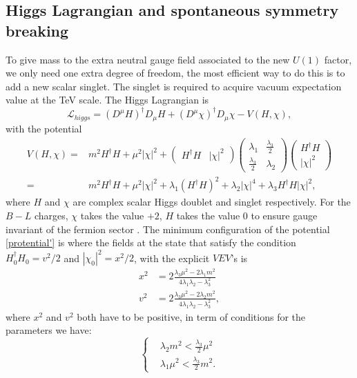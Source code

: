 \documentclass{report}
\newcommand{\nn}{\nonumber}
\numberwithin{equation}{section}
\begin{document}
\subsection{Higgs Lagrangian and spontaneous symmetry breaking}
To give mass to the extra neutral gauge field associated to the new $U(1)$ factor, we only need one extra degree of freedom, the most efficient way to do this is to add a new scalar singlet. The singlet is required to acquire vacuum expectation value at the TeV scale.
The Higgs Lagrangian is
\begin{equation}
\mathcal{L}_{higgs}=(D^\mu H)^\dagger D_\mu H+(D^\mu\chi)^\dagger  D_\mu \chi- V(H,\chi) \label{kinetic B-L},
\end{equation}
with the potential
\begin{align}
V(H,\chi)=& m^2H^\dagger H+\mu^2|\chi|^2+\begin{pmatrix}
H^\dagger H & |\chi|^2
\end{pmatrix}
\begin{pmatrix}
\lambda_1 & \frac{\lambda_3}{2}\\
\frac{\lambda_3}{2}& \lambda_2
\end{pmatrix}
\begin{pmatrix}
H^\dagger H\\
|\chi|^2
\end{pmatrix}\nn\\
=&m^2 H^\dagger H+\mu^2|\chi|^2+ \lambda_1(H^\dagger H)^2+\lambda_2 |\chi|^4+\lambda_3 H^\dagger H|\chi|^2\label{protential'},
\end{align}
where $H$ and $\chi$ are complex scalar Higgs doublet and singlet respectively. For the $B-L$ charges, $\chi$ takes the value $+2$, $H$ takes the value 0 to ensure gauge invariant of the fermion sector \cite{Basso:2011hn}.
The minimum configuration of the potential \eqref{protential'} is where the fields at the state that satisfy the condition $H_0^\dagger H_0=v^2/2$ and $|\chi_0|^2=x^2/2$, with the explicit $VEV$'s is
\begin{align}
x^2&=2\frac{\lambda_3 \mu^2-2\lambda_1 m^2}{4\lambda_1 \lambda_2-\lambda_3^2}\label{scalar1}\\
v^2&=2\frac{\lambda_3 \mu^2- 2\lambda_2 m^2}{4 \lambda_1 \lambda_2- \lambda_3^2}\label{scalar2},
\end{align}
where $x^2$ and $v^2$ both have to be positive, in term of conditions for the parameters we have:
\begin{equation}
\begin{cases}
&\lambda_2 m^2<\frac{\lambda_3}{2}\mu^2\\
&\lambda_1 \mu^2<\frac{\lambda_3}{2}m^2.
\end{cases}
\end{equation}
\end{document}
